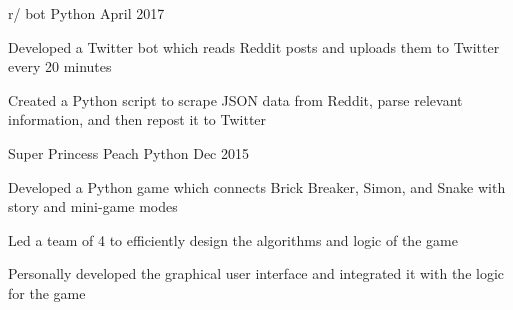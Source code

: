 \documentclass[]{awesome-cv}
\begin{document}
\begin{cventries}
    \cventry
    {}
    {r/ bot}
    {Python}
    {April 2017}
    {\begin{cvitems}
        \vspace{-4mm}
        \item {Developed a Twitter bot which reads Reddit posts and uploads them to Twitter every 20 minutes}
        \item {Created a Python script to scrape JSON data from Reddit, parse relevant information, and then repost it to Twitter}
    \end{cvitems}}
    \vspace{-2mm}

	\cventry
    {}
    {Super Princess Peach}
    {Python}
    {Dec 2015}
    {\begin{cvitems}
        \vspace{-4mm}
		\item {Developed a Python game which connects Brick Breaker, Simon, and Snake with story and mini-game modes}
		\item {Led a team of 4 to efficiently design the algorithms and logic of the game}
        \item {Personally developed the graphical user interface and integrated it with the logic for the game}
    \end{cvitems}}
	\vspace{-2mm}
\end{cventries}
\vspace{-10mm}
\end{document}
